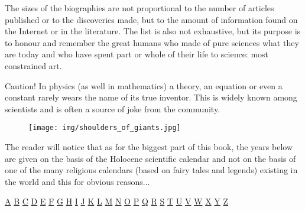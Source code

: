 	The sizes of the biographies are not proportional to the number of articles published or to the discoveries made, but to the amount of information found on the Internet or in the literature. The list is also not exhaustive, but its purpose is to honour and remember the great humans who made of pure sciences what they are today and who have spent part or whole of their life to science: most constrained art.

	\begin{tcolorbox}[enhanced,colback=red!5!white,colframe=black!50!red,boxrule=1pt,arc=0pt,outer arc=0pt,drop lifted shadow,after skip=10pt plus 2pt]
	\bcbombe Caution! In physics (as well in mathematics) a theory, an equation or even a constant rarely wears the name of its true inventor. This is widely known among scientists and is often a source of joke from the community.
	\end{tcolorbox}

	\begin{figure}[H]
		\centering
		\texttt{[image: img/shoulders\_of\_giants.jpg]}	
	\end{figure}
	
	The reader will notice that as for the biggest part of this book, the years below are given on the basis of the Holocene scientific calendar and not on the basis of one of the many religious calendars (based on fairy tales and legends) existing in the world and this for obvious reasons...

\begin{center}
\hyperref[sec:A]{A} \hyperref[sec:B]{B} \hyperref[sec:C]{C} \hyperref[sec:D]{D} \hyperref[sec:E]{E} \hyperref[sec:F]{F} \hyperref[sec:G]{G} \hyperref[sec:H]{H} \hyperref[sec:I]{I} \hyperref[sec:J]{J} \hyperref[sec:K]{K} \hyperref[sec:L]{L} \hyperref[sec:M]{M} \hyperref[sec:N]{N} \hyperref[sec:O]{O} \hyperref[sec:P]{P} \hyperref[sec:Q]{Q} \hyperref[sec:R]{R} \hyperref[sec:S]{S} \hyperref[sec:T]{T} \hyperref[sec:U]{U} \hyperref[sec:V]{V} \hyperref[sec:W]{W} \hyperref[sec:X]{X} \hyperref[sec:Y]{Y} \hyperref[sec:Z]{Z}
\end{center}

{}
\label{sec:A}
		
